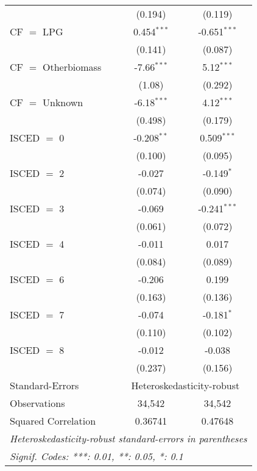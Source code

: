 \begin{table}[htbp!]
\begin{adjustbox}{width = 1\textwidth, max height = 0.95\textheight, center}
\begin{threeparttable}[b]
\begin{tabular}{lcc}
                                 & (0.194)       & (0.119)\\   
            CF $=$ LPG           & 0.454$^{***}$ & -0.651$^{***}$\\   
                                 & (0.141)       & (0.087)\\   
            CF $=$ Otherbiomass  & -7.66$^{***}$ & 5.12$^{***}$\\   
                                 & (1.08)        & (0.292)\\   
            CF $=$ Unknown       & -6.18$^{***}$ & 4.12$^{***}$\\   
                                 & (0.498)       & (0.179)\\   
            ISCED $=$ 0          & -0.208$^{**}$ & 0.509$^{***}$\\   
                                 & (0.100)       & (0.095)\\   
            ISCED $=$ 2          & -0.027        & -0.149$^{*}$\\   
                                 & (0.074)       & (0.090)\\   
            ISCED $=$ 3          & -0.069        & -0.241$^{***}$\\   
                                 & (0.061)       & (0.072)\\   
            ISCED $=$ 4          & -0.011        & 0.017\\   
                                 & (0.084)       & (0.089)\\   
            ISCED $=$ 6          & -0.206        & 0.199\\   
                                 & (0.163)       & (0.136)\\   
            ISCED $=$ 7          & -0.074        & -0.181$^{*}$\\   
                                 & (0.110)       & (0.102)\\   
            ISCED $=$ 8          & -0.012        & -0.038\\   
                                 & (0.237)       & (0.156)\\   
            \midrule 
            Standard-Errors & \multicolumn{2}{c}{Heteroskedasticity-robust} \\ 
            Observations         & 34,542        & 34,542\\  
            Squared Correlation  & 0.36741       & 0.47648\\  
            \midrule \midrule
            \multicolumn{3}{l}{\emph{Heteroskedasticity-robust standard-errors in parentheses}}\\
            \multicolumn{3}{l}{\emph{Signif. Codes: ***: 0.01, **: 0.05, *: 0.1}}\\
         \end{tabular}
         

\end{threeparttable}
\end{adjustbox}
\end{table}
